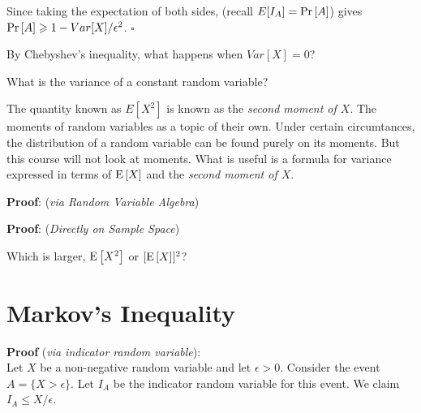 Since taking the expectation of both sides, 
(recall $E[I_A] = \text{Pr}\left[A\right]$) gives $\text{Pr}\left[A\right] \geqslant 1 - Var[X]/\epsilon^2$. $\square$

\frmrule

\begin{example}
By Chebyshev's inequality, what happens when $Var[X] = 0$?
\end{example}


\frmrule

\begin{example}
What is the variance of a constant random variable?
\end{example}





\frmrule

The quantity known as $E[X^2]$ is known as the \textit{second moment of $X$}. 
The moments of random variables as a topic of their own. Under certain circumtances, 
the distribution of a random variable can be found purely on its moments. But 
this course will not look at moments. What is useful is 
a formula for variance expressed in terms of $\text{E}\left[X\right]$ and 
the \textit{second moment of $X$}. 


\textbf{Proof}: (\textit{via Random Variable Algebra})

\frmrule

\textbf{Proof}: (\textit{Directly on Sample Space})


\frmrule

\begin{example}
Which is larger, $\text{E}\left[X^2\right]$ or $[\text{E}\left[X\right]]^2$?
\end{example}



\section{Markov's Inequality}

\frmrule

\textbf{Proof} (\textit{via indicator random variable}): \\
Let $X$ be a non-negative random variable and let $\epsilon > 0$. 
Consider the event $A = \{X > \epsilon\}$. Let $I_A$ be the indicator 
random variable for this event. We claim $I_A \leqslant X/\epsilon$. 

